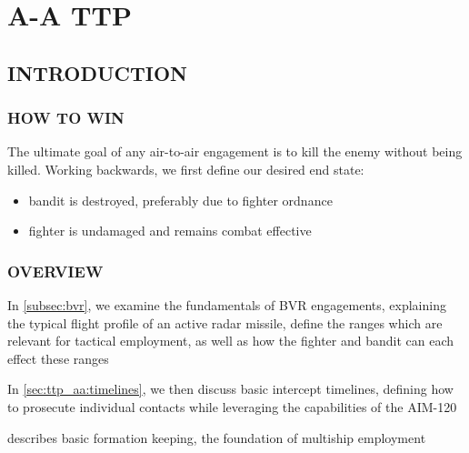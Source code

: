 \chapter{A-A TTP}
\localtableofcontents
\thispagestyle{plain}
\cleardoublepage

\section{INTRODUCTION}
\subsection{HOW TO WIN}
\begin{tcoloritemize}
    \blueitem[Goal]
    The ultimate goal of any air-to-air engagement is to kill the enemy without being killed. 
    Working backwards, we first define our desired end state:
    \begin{itemize}
        \item bandit is destroyed, preferably due to fighter ordnance
        \item fighter is undamaged and remains combat effective
    \end{itemize}
\end{tcoloritemize}

\subsection{OVERVIEW}
\begin{tcoloritemize}
    \blueitem[Fundamentals] 
    In \cref{subsec:bvr}, 
    we examine the fundamentals of BVR engagements, 
    explaining the typical flight profile of an active radar missile,
    define the ranges which are relevant for tactical employment,
    as well as how the fighter and bandit can each effect these ranges

    In \cref{sec:ttp_aa:timelines}, 
    we then discuss basic intercept timelines, 
    defining how to prosecute individual contacts while leveraging the capabilities of the AIM-120
    
    \blueitem[Formation]
     describes basic formation keeping, the foundation of multiship employment
\end{tcoloritemize}

\clearpage


